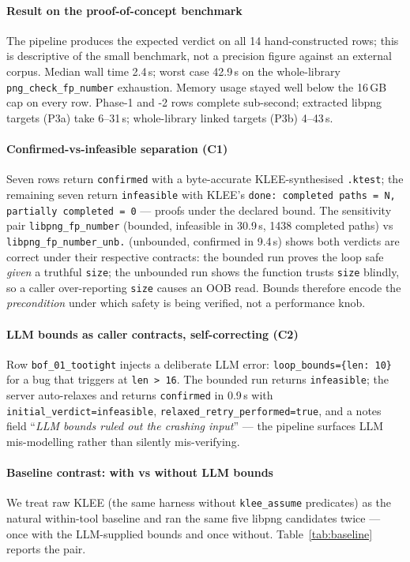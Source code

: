 \documentclass[3p,times,procedia]{elsarticle}
\begin{document}
\paragraph{Result on the proof-of-concept benchmark} The pipeline produces the expected verdict on all 14 hand-constructed rows; this is descriptive of the small benchmark, not a precision figure against an external corpus. Median wall time 2.4\,s; worst case 42.9\,s on the whole-library \texttt{png\_check\_fp\_number} exhaustion. Memory usage stayed well below the 16\,GB cap on every row. Phase-1 and -2 rows complete sub-second; extracted libpng targets (P3a) take 6--31\,s; whole-library linked targets (P3b) 4--43\,s.

\paragraph{Confirmed-vs-infeasible separation (C1)} Seven rows return \texttt{confirmed} with a byte-accurate KLEE-synthesised \texttt{.ktest}; the remaining seven return \texttt{infeasible} with KLEE's \texttt{done: completed paths = N, partially completed = 0} --- proofs under the declared bound. The sensitivity pair \texttt{libpng\_fp\_number} (bounded, infeasible in 30.9\,s, 1438 completed paths) vs \texttt{libpng\_fp\_number\_unb.} (unbounded, confirmed in 9.4\,s) shows both verdicts are correct under their respective contracts: the bounded run proves the loop safe \emph{given} a truthful \texttt{size}; the unbounded run shows the function trusts \texttt{size} blindly, so a caller over-reporting \texttt{size} causes an OOB read. Bounds therefore encode the \emph{precondition} under which safety is being verified, not a performance knob.

\paragraph{LLM bounds as caller contracts, self-correcting (C2)} Row \texttt{bof\_01\_tootight} injects a deliberate LLM error: \texttt{loop\_bounds=\{len: 10\}} for a bug that triggers at \texttt{len > 16}. The bounded run returns \texttt{infeasible}; the server auto-relaxes and returns \texttt{confirmed} in 0.9\,s with \texttt{initial\_verdict=infeasible}, \texttt{relaxed\_retry\_performed=true}, and a notes field ``\emph{LLM bounds ruled out the crashing input}'' --- the pipeline surfaces LLM mis-modelling rather than silently mis-verifying.

\paragraph{Baseline contrast: with vs without LLM bounds} We treat raw KLEE (the same harness without \texttt{klee\_assume} predicates) as the natural within-tool baseline and ran the same five libpng candidates twice --- once with the LLM-supplied bounds and once without. Table~\ref{tab:baseline} reports the pair.
\end{document}
